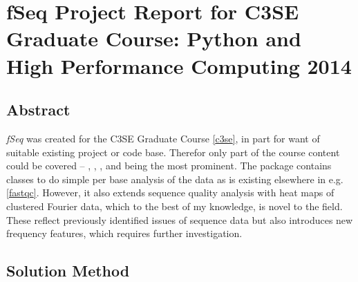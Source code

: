 \documentclass[letterpaper,10pt,english]{sphinxmanual}
\begin{document}
\section{fSeq Project Report for C3SE Graduate Course: Python and High Performance Computing 2014}
\label{c3se_python_course::doc}\label{c3se_python_course:fseq-project-report-for-c3se-graduate-course-python-and-high-performance-computing-2014}

\subsection{Abstract}
\label{c3se_python_course:abstract}
\emph{fSeq} was created for the C3SE Graduate Course {\hyperref[c3se_python_course:c3se]{{[}c3se{]}}}, in part for want of
suitable existing project or code base.
Therefor only part of the course content
could be covered -- , , ,  and
 being the most prominent.
The package contains classes to do simple per base analysis of the data as is
existing elsewhere in e.g. {\hyperref[c3se_python_course:fastqc]{{[}fastqc{]}}}.
However, it also extends sequence quality analysis with heat maps of
clustered Fourier data, which to the best of my knowledge, is novel to the
field.
These reflect previously identified issues of sequence data but also introduces
new frequency features, which requires further investigation.


\subsection{Solution Method}
\label{c3se_python_course:solution-method}
\end{document}
